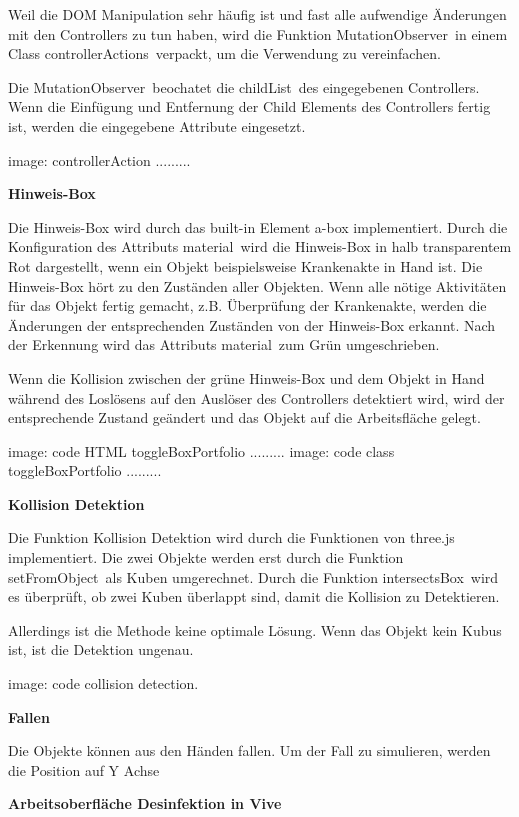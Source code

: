   Weil die DOM Manipulation sehr häufig ist und fast alle aufwendige Änderungen mit den Controllers zu tun haben, wird die Funktion \glqq MutationObserver\grqq\ in einem Class \glqq controllerActions\grqq\ verpackt, um die Verwendung zu vereinfachen.
  
  Die \glqq MutationObserver\grqq\ beochatet die \glqq childList\grqq\ des eingegebenen Controllers. Wenn die Einfügung und Entfernung der Child Elements des Controllers fertig ist, werden die eingegebene Attribute eingesetzt. 
  
  image: controllerAction .........
  
  \textbf{Hinweis-Box}
  
  Die Hinweis-Box wird durch das built-in Element a-box implementiert. Durch die Konfiguration des Attributs \glqq material\grqq\ wird die Hinweis-Box in halb transparentem Rot dargestellt, wenn ein Objekt beispielsweise Krankenakte in Hand ist. Die Hinweis-Box hört zu den Zuständen aller Objekten. Wenn alle nötige Aktivitäten für das Objekt fertig gemacht, z.B. Überprüfung der Krankenakte, werden die Änderungen der entsprechenden Zuständen von der Hinweis-Box erkannt. Nach der Erkennung wird das Attributs \glqq material\grqq\ zum Grün umgeschrieben.
  
  Wenn die Kollision zwischen der grüne Hinweis-Box und dem Objekt in Hand während des Loslösens auf den Auslöser des Controllers detektiert wird, wird der entsprechende Zustand geändert und das Objekt auf die Arbeitsfläche gelegt.
  
  image: code HTML toggleBoxPortfolio .........
  image: code class toggleBoxPortfolio .........
  
  \textbf{Kollision Detektion}
  
  Die Funktion Kollision Detektion wird durch die Funktionen von three.js implementiert. Die zwei Objekte werden erst durch die Funktion \glqq setFromObject\grqq\ als Kuben umgerechnet. Durch die Funktion \glqq intersectsBox\grqq\ wird es überprüft, ob zwei Kuben überlappt sind, damit die Kollision zu Detektieren.
  
  Allerdings ist die Methode keine optimale Lösung. Wenn das Objekt kein Kubus ist, ist die Detektion ungenau.
  
  image: code collision detection.
  
  \textbf{Fallen}
  
  Die Objekte können aus den Händen fallen. Um der Fall zu simulieren, werden die Position auf Y Achse 
  
  \textbf{Arbeitsoberfläche Desinfektion in Vive}
  
